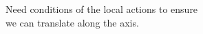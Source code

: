 \documentclass[preview]{standalone}
\begin{document}
Need conditions of the local actions to ensure \\ we can translate along the axis.\\
\end{document}
